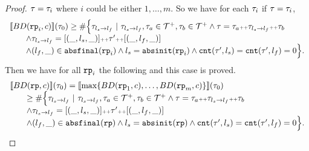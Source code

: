 \begin{proof}
$\mathtt{\tau} = \mathtt{\tau}_i$ where $i$ could be either $1, \ldots, m$.
So we have for each $\mathtt{\tau}_i$ if $\mathtt{\tau} = \mathtt{\tau}_i$, 
\[
  \begin{array}{l}
    \llbracket BD(\mathtt{rp}_i, c) \rrbracket(\mathtt{\tau}_0) \geq
    \# \Big\{\mathtt{\tau}_{l_s \to l_f} ~\vert~ \mathtt{\tau}_{l_s \to l_f}, \mathtt{\tau}_a \in \mathcal{T}^{+}, \mathtt{\tau}_b \in \mathcal{T}^{+}
    \land \mathtt{\tau} = \mathtt{\tau}_a {\scriptscriptstyle ++} \mathtt{\tau}_{l_s \to l_f} {\scriptscriptstyle ++} \mathtt{\tau}_b
    \\ \qquad
    \land \mathtt{\tau}_{l_s \to l_f} = [(\_, l_s, \_)] {\scriptscriptstyle ++} \mathtt{\tau}' {\scriptscriptstyle ++} [(\_, l_f, \_)]
    \\ \qquad
    \land (l_{f}, \_) \in \mathtt{abs}{\mathtt{final}}(\mathtt{rp}_i)
    \land l_s = \mathtt{abs}{\mathtt{init}}(\mathtt{rp}_i)
    \land \mathtt{cnt}(\mathtt{\tau}', l_s) = \mathtt{cnt}(\mathtt{\tau}', l_f) = 0 
    \Big\}.
      \end{array}
\]
Then we have for all $\mathtt{rp}_i$ the following and this case is proved.
\[
  \begin{array}{l}
    \econfig{BD(\rprog, c)}(\trace_0) = 
    \econfig{ \max\left\{ BD(\rprog_1, c), \ldots, BD(\rprog_m, c) \right\}}(\trace_0)
    \\ \qquad 
    \geq
    \# \Big\{\trace_{l_s \to l_f} ~\vert~ \trace_{l_s \to l_f}, \trace_a \in \ftdom, \trace_b \in \ftdom
    \land \trace = \trace_a \tracecat \trace_{l_s \to l_f} \tracecat \trace_b
    \\ \qquad
    \land \trace_{l_s \to l_f} = [(\_, l_s, \_)] \tracecat \trace' \tracecat [(\_, l_f, \_)]
    \\ \qquad
    \land (l_{f}, \_) \in \absfinal(\rprog)
    \land l_s = \absinit(\rprog)
    \land \counter(\trace', l_s) = \counter(\trace', l_f) = 0 
    \Big\}.
      \end{array}
\]


\end{proof}
